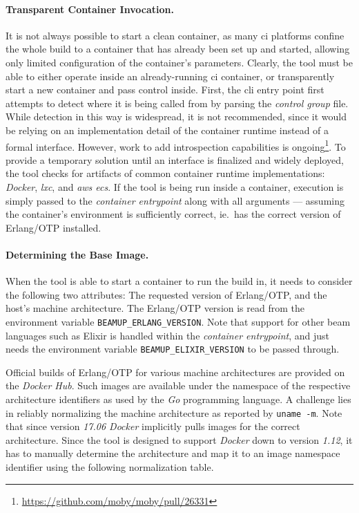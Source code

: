 \paragraph{Transparent Container Invocation.} It is not always possible to start a clean container, as many \acrshort{ci} platforms confine the whole build to a container that has already been set up and started, allowing only limited configuration of the container's parameters. Clearly, the tool must be able to either operate inside an already-running \acrshort{ci} container, or transparently start a new container and pass control inside. First, the \acrshort{cli} entry point first attempts to detect where it is being called from by parsing the \emph{control group} file. While detection in this way is widespread, it is not recommended, since it would be relying on an implementation detail of the container runtime instead of a formal interface. However, work to add introspection capabilities is ongoing\footnote{\url{https://github.com/moby/moby/pull/26331}}. To provide a temporary solution until an interface is finalized and widely deployed, the tool checks for artifacts of common container runtime implementations: \emph{Docker}, \emph{\acrfull{lxc}}, and \emph{\acrfull{aws} \acrfull{ecs}}. If the tool is being run inside a container, execution is simply passed to the \emph{container entrypoint} along with all arguments --- assuming the container's environment is sufficiently correct, ie.~has the correct version of Erlang/OTP installed.


\paragraph{Determining the Base Image.} When the tool is able to start a container to run the build in, it needs to consider the following two attributes: The requested version of Erlang/OTP, and the host's machine architecture. The Erlang/OTP version is read from the environment variable \lstinline{BEAMUP_ERLANG_VERSION}. Note that support for other \acrshort{beam} languages such as Elixir is handled within the \emph{container entrypoint}, and just needs the environment variable \lstinline{BEAMUP_ELIXIR_VERSION} to be passed through.

Official builds of Erlang/OTP for various machine architectures are provided on the \emph{Docker Hub}. Such images are available under the namespace of the respective architecture identifiers as used by the \emph{Go} programming language. A challenge lies in reliably normalizing the machine architecture as reported by \lstinline|uname -m|. Note that since version \emph{17.06 Docker} implicitly pulls images for the correct architecture. Since the tool is designed to support \emph{Docker} down to version \emph{1.12}, it has to manually determine the architecture and map it to an image namespace identifier using the following normalization table.

